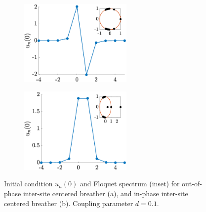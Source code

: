 \documentclass[12pt,reqno]{amsart}
\theoremstyle{definition}
\begin{document}
\begin{figure}
	\begin{center}
	\begin{subfigure}{0.3\linewidth}
		\caption{}
		\includegraphics[width=5.5cm]{SGintersitepm.eps} \hspace{-0.5cm}
		\label{fig:SGintersitea} 
	\end{subfigure}
	\begin{subfigure}{0.3\linewidth}
		\caption{}
		\includegraphics[width=5.5cm]{SGintersitepp.eps} \hspace{-0.5cm}
		\label{fig:SGintersiteb} 
	\end{subfigure}
	\end{center}
	\caption{Initial condition $u_n(0)$ and Floquet spectrum (inset) for out-of-phase inter-site centered breather (a), and in-phase inter-site centered breather (b). Coupling parameter $d=0.1$.}
	\label{fig:SGintersite}
\end{figure}
\end{document}
